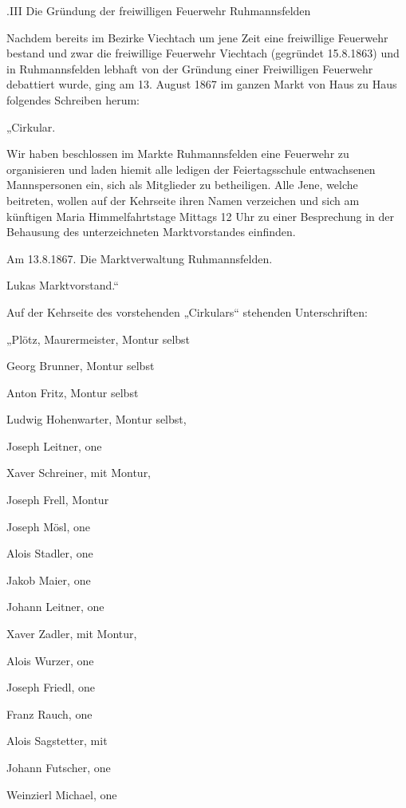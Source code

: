 \documentclass[12pt,a4paper]{book}
\begin{document}
.III Die Gründung der freiwilligen Feuerwehr Ruhmannsfelden

Nachdem bereits im Bezirke Viechtach um jene Zeit eine freiwillige Feuerwehr
bestand und zwar die freiwillige Feuerwehr Viechtach (gegründet 15.8.1863) und
in Ruhmannsfelden lebhaft von der Gründung einer Freiwilligen Feuerwehr
debattiert wurde, ging am 13. August 1867 im ganzen Markt von Haus zu Haus
folgendes Schreiben herum:



„Cirkular.



Wir haben beschlossen im Markte Ruhmannsfelden eine Feuerwehr zu organisieren
und laden hiemit alle ledigen der Feiertagsschule entwachsenen Mannspersonen
ein, sich als Mitglieder zu betheiligen. Alle Jene, welche beitreten, wollen auf
der Kehrseite ihren Namen verzeichen und sich am künftigen Maria
Himmelfahrtstage Mittags 12 Uhr zu einer Besprechung in der Behausung des
unterzeichneten Marktvorstandes einfinden.



Am 13.8.1867. Die Marktverwaltung Ruhmannsfelden.

Lukas Marktvorstand.“



Auf der Kehrseite des vorstehenden „Cirkulars“ stehenden Unterschriften:



„Plötz, Maurermeister, Montur selbst

Georg Brunner, Montur selbst

Anton Fritz, Montur selbst

Ludwig Hohenwarter, Montur selbst,

Joseph Leitner, one

Xaver Schreiner, mit Montur,

Joseph Frell, Montur

Joseph Mösl, one

Alois Stadler, one

Jakob Maier, one

Johann Leitner, one

Xaver Zadler, mit Montur,

Alois Wurzer, one

Joseph Friedl, one

Franz Rauch, one

Alois Sagstetter, mit

Johann Futscher, one

Weinzierl Michael, one
\end{document}
